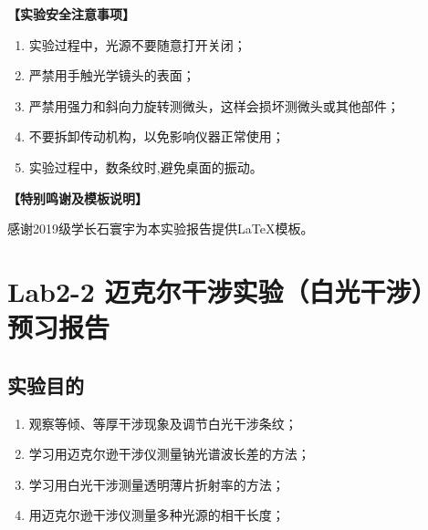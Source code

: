 \documentclass[dvipsnames, svgnames,a4paper,11pt]{article}
\begin{document}
	\textbf{【实验安全注意事项】}	
	\begin{enumerate}
		\item 实验过程中，光源不要随意打开关闭；
		\item 严禁用手触光学镜头的表面；
		\item 严禁用强力和斜向力旋转测微头，这样会损坏测微头或其他部件；
		\item 不要拆卸传动机构，以免影响仪器正常使用；
		\item 实验过程中，数条纹时,避免桌面的振动。
	\end{enumerate}
	
	
	\textbf{【特别鸣谢及模板说明】}	
	
	感谢2019级学长石寰宇为本实验报告提供\LaTeX 模板。%
	
	
	
	\clearpage
	\tableofcontents
	\clearpage
	
	
	
	
	\setcounter{section}{0}
	\section{Lab2-2 迈克尔干涉实验（白光干涉） \quad\heiti 预习报告}
	
	\subsection{实验目的}
	\begin{enumerate}
		\item 观察等倾、等厚干涉现象及调节白光干涉条纹；
		\item 学习用迈克尔逊干涉仪测量钠光谱波长差的方法；
		\item 学习用白光干涉测量透明薄片折射率的方法；
		\item 用迈克尔逊干涉仪测量多种光源的相干长度；
	\end{enumerate}
	
\end{document}
